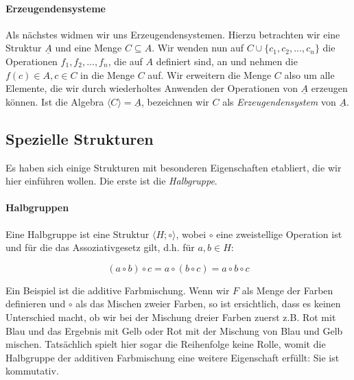 \documentclass{scrartcl}
\begin{document}
\paragraph{Erzeugendensysteme}
Als nächstes widmen wir uns Erzeugendensystemen. Hierzu betrachten wir eine Struktur $\underline{A}$ und eine Menge $C \subseteq A$. Wir wenden nun auf $C \cup \{c_1, c_2, ..., c_n\}$
die Operationen $f_1, f_2, ..., f_n$, die auf $A$ definiert sind, an und nehmen die $f(c) \in A, c \in C$ in die Menge $C$ auf. Wir erweitern die Menge $C$ also um alle Elemente, die wir
durch wiederholtes Anwenden der Operationen von $\underline{A}$ erzeugen können. Ist die Algebra $\langle C \rangle = \underline{A}$, bezeichnen wir $C$ als \emph{Erzeugendensystem} von 
$\underline{A}$.

\subsection{Spezielle Strukturen}

Es haben sich einige Strukturen mit besonderen Eigenschaften etabliert, die wir hier einführen wollen. Die erste ist die \emph{Halbgruppe}.

\paragraph{Halbgruppen}
Eine Halbgruppe ist eine Struktur $\langle H; \circ \rangle$, wobei $\circ$ eine zweistellige Operation ist und für die das Assoziativgesetz gilt, d.h. für $a, b \in H$:

\begin{equation*}
    (a \circ b) \circ c = a \circ (b \circ c) = a \circ b \circ c
\end{equation*}

Ein Beispiel ist die additive Farbmischung. Wenn wir $F$ als Menge der Farben definieren und $\circ$ als das Mischen zweier Farben, so ist ersichtlich, dass es keinen Unterschied macht,
ob wir bei der Mischung dreier Farben zuerst z.B. Rot mit Blau und das Ergebnis mit Gelb oder Rot mit der Mischung von Blau und Gelb mischen. Tatsächlich spielt hier sogar die Reihenfolge
keine Rolle, womit die Halbgruppe der additiven Farbmischung eine weitere Eigenschaft erfüllt: Sie ist kommutativ.
\end{document}
